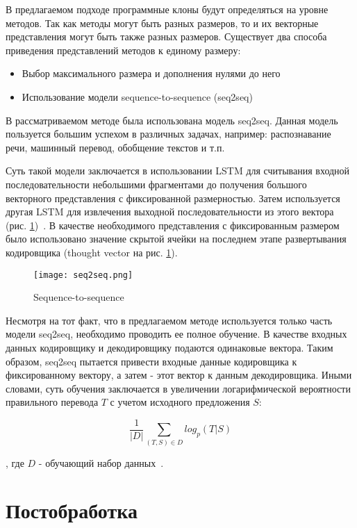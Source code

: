 В предлагаемом подходе программные клоны будут определяться на уровне методов. Так как методы могут быть разных размеров, то и их векторные представления могут быть также разных размеров. Существует два способа приведения представлений методов к единому размеру:

\begin{itemize}
\setlength\itemsep{0mm}
\item Выбор максимального размера и дополнения нулями до него
\item Использование модели sequence-to-sequence	(seq2seq)
\end{itemize}

В рассматриваемом методе была использована модель seq2seq. Данная модель пользуется большим успехом в различных задачах, например: распознавание речи, машинный перевод, обобщение текстов и т.п.

Суть такой модели заключается в использовании LSTM для считывания входной последовательности небольшими фрагментами до получения большого векторного представления с фиксированной размерностью. Затем используется другая LSTM для извлечения выходной последовательности из этого вектора (рис. \ref{fig:seq2seq})~\cite{seq2seq}. В качестве необходимого представления с фиксированным размером было использовано значение скрытой ячейки на последнем этапе развертывания кодировщика (thought vector на рис. \ref{fig:seq2seq}).

\begin{figure}[htbp]
\centering
\texttt{[image: seq2seq.png]}
\caption{Sequence-to-sequence}
\label{fig:seq2seq}
\end{figure}

Несмотря на тот факт, что в предлагаемом методе используется только часть модели seq2seq, необходимо проводить ее полное обучение. В качестве входных данных кодировщику и декодировщику подаются одинаковые вектора. Таким образом, seq2seq пытается привести входные данные кодировщика к фиксированному вектору, а затем - этот вектор к данным декодировщика. Иными словами, суть обучения заключается в увеличении логарифмической вероятности правильного перевода \(T\) с учетом исходного предложения \(S\):

\begin{equation}
\frac{1}{|D|}\sum_{(T,S) \in D} log_p(T|S)
\end{equation}

, где \(D\) - обучающий набор данных~\cite{seq2seq}.

\section{Постобработка}

